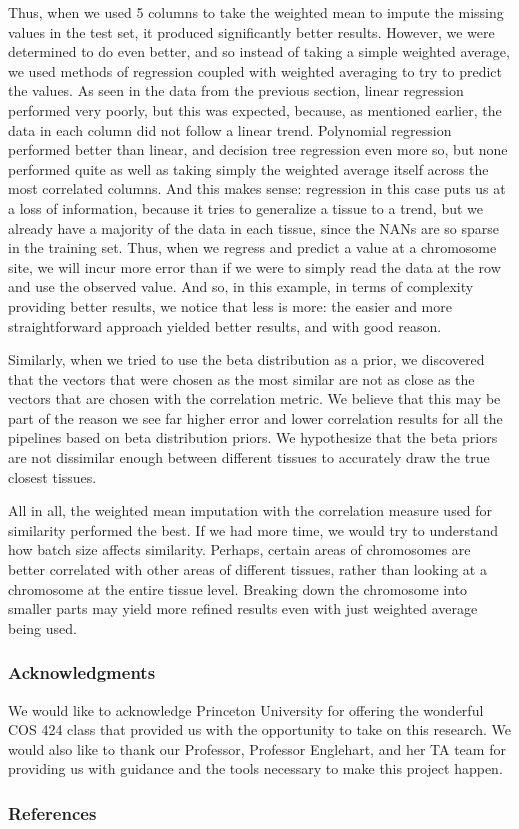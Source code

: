 \documentclass{article} %
\begin{document}
Thus, when we used 5 columns to take the weighted mean to impute the missing values in the test set, it produced significantly better results. However, we were determined to do even better, and so instead of taking a simple weighted average, we used methods of regression coupled with weighted averaging to try to predict the values. As seen in the data from the previous section, linear regression performed very poorly, but this was expected, because, as mentioned earlier, the data in each column did not follow a linear trend. Polynomial regression performed better than linear, and decision tree regression even more so, but none performed quite as well as taking simply the weighted average itself across the most correlated columns. And this makes sense: regression in this case puts us at a loss of information, because it tries to generalize a tissue to a trend, but we already have a majority of the data in each tissue, since the NANs are so sparse in the training set. Thus, when we regress and predict a value at a chromosome site, we will incur more error than if we were to simply read the data at the row and use the observed value. And so, in this example, in terms of complexity providing better results, we notice that less is more: the easier and more straightforward approach yielded better results, and with good reason.

Similarly, when we tried to use the beta distribution as a prior, we discovered that the vectors that were chosen as the most similar are not as close as the vectors that are chosen with the correlation metric. We believe that this may be part of the reason we see far higher error and lower correlation results for all the pipelines based on beta distribution priors. We hypothesize that the beta priors are not dissimilar enough between different tissues to accurately draw the true closest tissues.

All in all, the weighted mean imputation with the correlation measure used for similarity performed the best. If we had more time, we would try to understand how batch size affects similarity. Perhaps, certain areas of chromosomes are better correlated with other areas of different tissues, rather than looking at a chromosome at the entire tissue level. Breaking down the chromosome into smaller parts may yield more refined results even with just weighted average being used.

\subsubsection*{Acknowledgments}
We would like to acknowledge Princeton University for offering the wonderful COS 424 class that provided us with the opportunity to take on this research. We would also like to thank our Professor, Professor Englehart, and her TA team for providing us with guidance and the tools necessary to make this project happen.


\subsubsection*{References}
\end{document}
